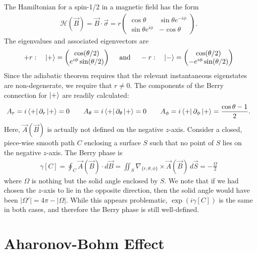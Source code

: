 \documentclass{article}
\theoremstyle{definition}
\newcommand{\p}{\partial}
\newcommand{\f}[2]{\frac{#1}{#2}}
\begin{document}
The Hamiltonian for a spin-1/2 in a magnetic field has the form
\begin{align*}
\mathcal{H}(\vec{B}) = \vec{B}\cdot \vec{\sigma} = r \begin{pmatrix}
\cos\theta & \sin\theta e^{-i\phi} \\ \sin\theta e^{i\phi} & -\cos\theta
\end{pmatrix}.
\end{align*}
The eigenvalues and associated eigenvectors are
\begin{align*}
+r: \quad \ket{+} = \begin{pmatrix}
\cos(\theta/2) \\ e^{i\phi}\sin(\theta/2) 
\end{pmatrix} \quad \text{ and } \quad -r: \quad \ket{-} = \begin{pmatrix}
\cos(\theta/2) \\ - e^{i\phi}\sin(\theta/2) 
\end{pmatrix} 
\end{align*}
Since the adiabatic theorem requires that the relevant instantaneous eigenstates are non-degenerate, we require that $r  \neq 0$. The components of the Berry connection for $\ket{+}$ are readily calculated:
\begin{align*}
A_r = i\bra{+}\p_r \ket{+} = 0 \quad\quad A_\theta = i\bra{+}\p_\theta\ket{+} = 0\quad\quad 
A_\phi = i\bra{+}\p_\phi \ket{+} = \f{\cos\theta - 1}{2}. 
\end{align*}
Here, $\vec{A}(\vec{B})$ is actually not defined on the negative $z$-axis. Consider a closed, piece-wise smooth path $C$ enclosing a surface $S$ such that no point of $S$ lies on the negative $z$-axis. The Berry phase is 
\begin{align*}
\gamma[C] = \oint_C \vec{A}(\vec{B}) \cdot d\vec{B} = \iint_S \nabla_{\{r,\theta,\phi\}} \times \vec{A}(\vec{B})  \, d\vec{S} = -\f{\Omega}{2} 
\end{align*}
where $\Omega$ is nothing but the solid angle enclosed by $S$. We note that if we had chosen the $z$-axis to lie in the opposite direction, then the solid angle would have been $|\Omega'| = 4\pi - |\Omega|$.  While this appears problematic,  $\exp(i\gamma[C])$ is the same in both cases, and therefore the Berry phase is still well-defined. 




\section{Aharonov-Bohm Effect}
\end{document}
